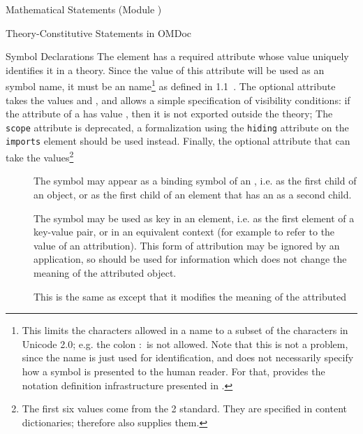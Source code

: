 \begin{tchapter}[id=statements,short=Mathematical Statements]{Mathematical Statements (Module {})}
\begin{tsection}[id=definitions]{Theory-Constitutive Statements in OMDoc}
\begin{tsubsection}[id=symbol-dec]{Symbol Declarations}
  The {} element has a required attribute {} whose
  value uniquely identifies it in a theory.  Since the value of this attribute will be
  used as an {\openmath} symbol name, it must be an {\xml} name\footnote{This limits the
    characters allowed in a name to a subset of the characters in Unicode 2.0; e.g. the
    colon $\colon$ is not allowed. Note that this is not a problem, since the name is just
    used for identification, and does not necessarily specify how a symbol is presented to
    the human reader. For that, {\omdoc} provides the notation definition infrastructure
    presented in {}.} as defined in {\xml} 1.1~\cite{xml1.1:04}. The
  optional attribute {} takes the values
  {} and {}, and allows a
  simple specification of visibility conditions: if the {}
  attribute of a {} has value {}, then it is
  not exported outside the theory; The {\tt{scope}} attribute is
  deprecated, a formalization using the {\tt{hiding}} attribute on the {\tt{imports}}
  element should be used instead.  Finally, the optional attribute
  {} that can take the values\footnote{The first six values come
    from the {\openmath}2 standard. They are specified in content dictionaries; therefore
    {\omdoc} also supplies them.}
  \begin{description}
  \item[{}] The symbol may appear as a binding symbol of an
    {}, i.e. as the first child of an
    {} object, or as the first child of an
    {} element that has an {} as a second
    child.
  \item[{}] The symbol may be used as key in an
    {\openmath} {} element, i.e. as the first element of a
    key-value pair, or in an equivalent context (for example to refer to the value of an
    attribution).  This form of attribution may be ignored by an application, so should be
    used for information which does not change the meaning of the attributed {\openmath}
    object.
  \item[{}] This is the same as
    {} except that it modifies the meaning of the attributed

\end{description}
\end{tsubsection}
\end{tsection}
\end{tchapter}
